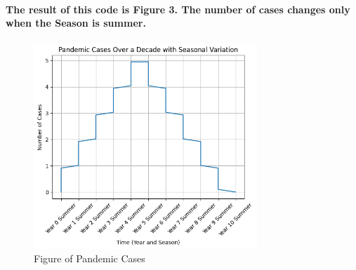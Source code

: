 \paragraph{The result of this code is \textbf{Figure 3}. The number of cases changes only when the Season is summer.}
% 
% 
% 
% 
% 
% 
% 
% 
% 
% 
% 
\begin{figure}[H]
    \centering
    \includegraphics[width=0.75\textwidth]{pic/Pandemic_cases.png}
    \caption{Figure of Pandemic Cases}
\end{figure}
% 
% 
% 
% 
% 
% 
% 
% 
% 
% 